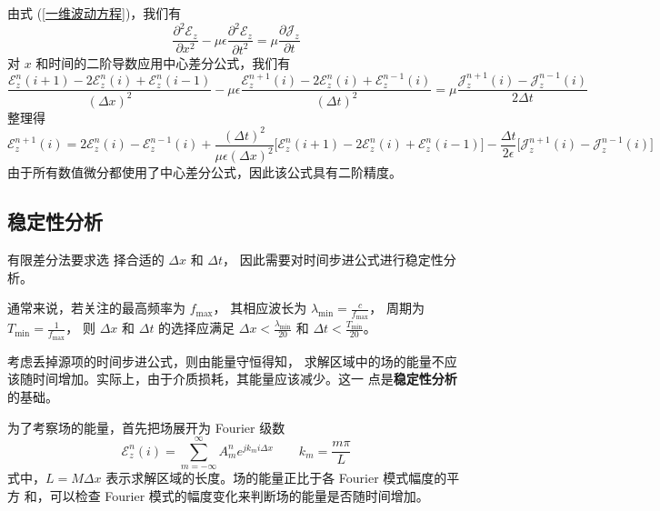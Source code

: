 \begin{solution}
    由式 (\ref{一维波动方程})，我们有
    \begin{equation*}
        \frac{\partial^2 \mathscr{E}_z}{\partial x^2}
        -\mu \epsilon \frac{\partial^2 \mathscr{E}_z}{\partial t^2}
        =\mu \frac{\partial \mathscr{J}_z}{\partial t}
    \end{equation*}
    对 $x$ 和时间的二阶导数应用中心差分公式，我们有
    \begin{equation*}
        \frac{\mathscr{E}_z^{n}(i+1)-2\mathscr{E}_z^n(i)+\mathscr{E}_z^{n}(i-1)}{(\Delta x)^2}
        -\mu \epsilon \frac{\mathscr{E}_z^{n+1}(i)-2\mathscr{E}_z^n(i)+\mathscr{E}_z^{n-1}(i)}{(\Delta t)^2}
        =\mu \frac{\mathscr{J}_z^{n+1}(i)-\mathscr{J}_z^{n-1}(i)}{2\Delta t}
    \end{equation*}
    整理得
    \begin{equation*}
        \mathscr{E}_z^{n+1}(i)=2\mathscr{E}_z^n(i)-\mathscr{E}_z^{n-1}(i)
        +\frac{(\Delta t)^2}{\mu \epsilon (\Delta x)^2}
        \Big[\mathscr{E}_z^n(i+1)-2\mathscr{E}_z^n(i)+\mathscr{E}_z^n(i-1)\Big]
        -\frac{\Delta t}{2\epsilon}\Big[\mathscr{J}_z^{n+1}(i)-\mathscr{J}_z^{n-1}(i)\Big]
    \end{equation*}
    由于所有数值微分都使用了中心差分公式，因此该公式具有二阶精度。
\end{solution}

\subsection{稳定性分析}

\par 有限差分法要求选
择合适的 $\Delta x$ 和 $\Delta t$，
因此需要对时间步进公式进行稳定性分析。

\begin{note}
    通常来说，若关注的最高频率为 $f_{\text{max}}$，
    其相应波长为 $\lambda_{\text{min}}=\frac{c}{f_{\text{max}}}$，
    周期为 $T_{\text{min}}=\frac{1}{f_{\text{max}}}$，
    则 $\Delta x$ 和 $\Delta t$ 的选择应满足
    $\Delta x < \frac{\lambda_{\text{min}}}{20}$ 和
    $\Delta t < \frac{T_{\text{min}}}{20}$。
\end{note}

\par 考虑丢掉源项的时间步进公式，则由能量守恒得知，
求解区域中的场的能量不应该随时间增加。实际上，由于介质损耗，其能量应该减少。这一
点是\textbf{稳定性分析}的基础。

\par 为了考察场的能量，首先把场展开为 Fourier 级数
\begin{equation}
    \mathscr{E}_z^{n}(i)=
    \sum_{m=-\infty}^{\infty}
    A_m^n e^{jk_m i \Delta x}
    \qquad k_m = \frac{m\pi}{L}
    \label{场的 Fourier 展开}
\end{equation}
式中，$L=M \Delta x$ 表示求解区域的长度。场的能量正比于各 Fourier 模式幅度的平方
和，可以检查 Fourier 模式的幅度变化来判断场的能量是否随时间增加。

